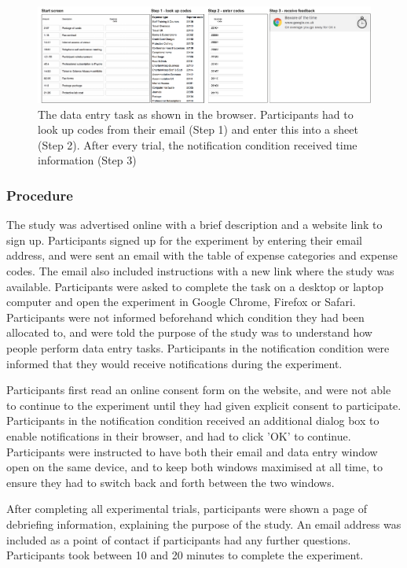 \begin{figure}
\centering
\includegraphics[width=\textwidth]{images/ch56/ch56-6_taskinterface.pdf}
\caption[Study 6 data entry task layout]{The data entry task as shown in the browser. Participants had to look up codes from their email (Step 1) and enter this into a sheet (Step 2). After every trial, the notification condition received time information (Step 3)}
\label{fig:ch56-6_TaskInterface}
\end{figure}

\subsubsection{Procedure}
The study was advertised online with a brief description and a website link to sign up. Participants signed up for the experiment by entering their email address, and were sent an email with the table of expense categories and expense codes. The email also included instructions with a new link where the study was available. Participants were asked to complete the task on a desktop or laptop computer and open the experiment in Google Chrome, Firefox or Safari. Participants were not informed beforehand which condition they had been allocated to, and were told the purpose of the study was to understand how people perform data entry tasks. Participants in the notification condition were informed that they would receive notifications during the experiment. 

Participants first read an online consent form on the website, and were not able to continue to the experiment until they had given explicit consent to participate. Participants in the notification condition received an additional dialog box to enable notifications in their browser, and had to click 'OK' to continue. Participants were instructed to have both their email and data entry window open on the same device, and to keep both windows maximised at all time, to ensure they had to switch back and forth between the two windows. 

After completing all experimental trials, participants were shown a page of debriefing information, explaining the purpose of the study. An email address was included as a point of contact if participants had any further questions. Participants took between 10 and 20 minutes to complete the experiment.

